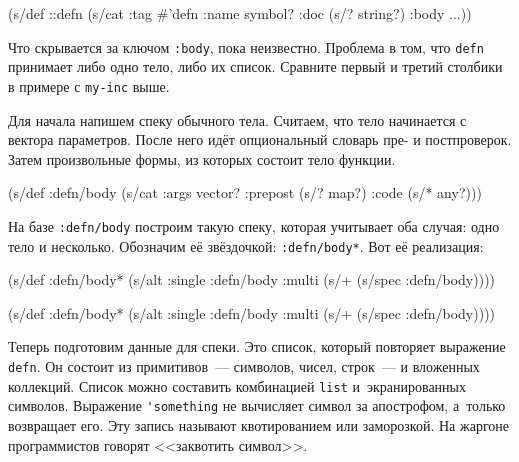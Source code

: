 \begin{english}
  \begin{clojure}
(s/def ::defn
  (s/cat :tag #{'defn}
         :name symbol?
         :doc (s/? string?)
         :body ...))
  \end{clojure}
\end{english}

Что скрывается за ключом \verb|:body|, пока неизвестно. Проблема в том, что
\verb|defn| принимает либо одно тело, либо их список. Сравните первый и третий
столбики в примере с \verb|my-inc| выше.

Для начала напишем спеку обычного тела. Считаем, что тело начинается с вектора
параметров. После него идёт опциональный словарь пре- и постпроверок. Затем
произвольные формы, из которых состоит тело функции.

\begin{english}
  \begin{clojure}
(s/def :defn/body
  (s/cat :args vector?
         :prepost (s/? map?)
         :code (s/* any?)))
  \end{clojure}
\end{english}

На базе \verb|:defn/body| построим такую спеку, которая учитывает оба случая:
одно тело и несколько. Обозначим её звёздочкой: \verb|:defn/body*|. Вот её
реализация:

\ifx\DEVICETYPE\MOBILE

\begin{english}
  \begin{clojure}
(s/def :defn/body*
  (s/alt :single :defn/body
         :multi (s/+
                  (s/spec :defn/body))))
  \end{clojure}
\end{english}

\else

\begin{english}
  \begin{clojure}
(s/def :defn/body*
  (s/alt :single :defn/body
         :multi (s/+ (s/spec :defn/body))))
  \end{clojure}
\end{english}

\fi


Теперь подготовим данные для спеки. Это список, который повторяет выражение
\verb|defn|. Он состоит из примитивов~--- символов, чисел, строк~--- и вложенных
коллекций. Список можно составить комбинацией \verb|list| и~экранированных
символов. Выражение \verb|'something| не вычисляет символ за апострофом,
а~только возвращает его. Эту запись называют квотированием  или
заморозкой. На жаргоне программистов говорят <<заквотить символ>>.

